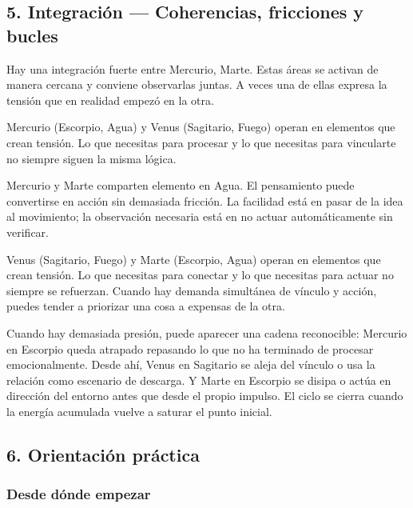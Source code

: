 \documentclass[11pt,a4paper]{article}
\begin{document}
\vspace{0.8cm}

\subsection{5. Integración — Coherencias, fricciones y bucles}

\justifying
Hay una integración fuerte entre Mercurio, Marte. Estas áreas se activan de manera cercana y conviene observarlas juntas. A veces una de ellas expresa la tensión que en realidad empezó en la otra.

Mercurio (Escorpio, Agua) y Venus (Sagitario, Fuego) operan en elementos que crean tensión. Lo que necesitas para procesar y lo que necesitas para vincularte no siempre siguen la misma lógica.

Mercurio y Marte comparten elemento en Agua. El pensamiento puede convertirse en acción sin demasiada fricción. La facilidad está en pasar de la idea al movimiento; la observación necesaria está en no actuar automáticamente sin verificar.

Venus (Sagitario, Fuego) y Marte (Escorpio, Agua) operan en elementos que crean tensión. Lo que necesitas para conectar y lo que necesitas para actuar no siempre se refuerzan. Cuando hay demanda simultánea de vínculo y acción, puedes tender a priorizar una cosa a expensas de la otra.

Cuando hay demasiada presión, puede aparecer una cadena reconocible: Mercurio en Escorpio queda atrapado repasando lo que no ha terminado de procesar emocionalmente. Desde ahí, Venus en Sagitario se aleja del vínculo o usa la relación como escenario de descarga. Y Marte en Escorpio se disipa o actúa en dirección del entorno antes que desde el propio impulso. El ciclo se cierra cuando la energía acumulada vuelve a saturar el punto inicial.

\vspace{0.8cm}

\subsection{6. Orientación práctica}

\subsubsection*{Desde dónde empezar}
\end{document}
